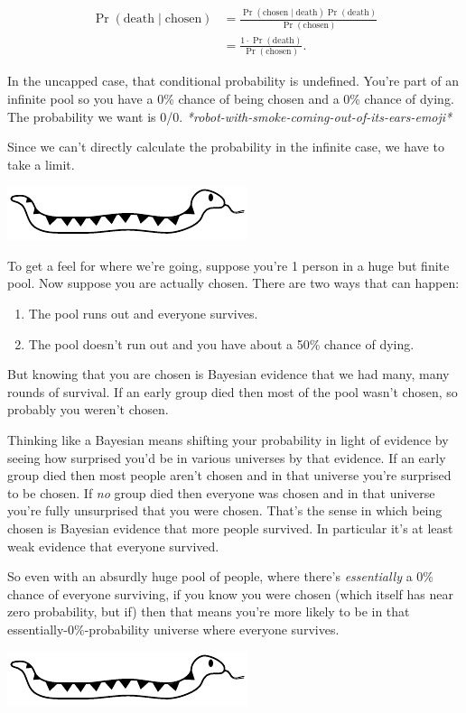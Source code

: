 \documentclass[article,twocolumn]{memoir}
\newcommand{\snakedivider}{
\vspace{.2em}
\begin{center}
\includegraphics[width=.25\linewidth]{snake}
\end{center}
\vspace{.1em}
}
\begin{document}
\begin{equation*}
\begin{split}
\Pr(\text{death} \mid \text{chosen}) & =
\frac{\Pr(\text{chosen} \mid \text{death}) \Pr(\text{death})}{\Pr(\text{chosen})} \\
& = \frac{1\cdot\Pr(\text{death})}{\Pr(\text{chosen})}.
\end{split}
\end{equation*}

In the uncapped case, that conditional probability is undefined. 
You're part of an infinite pool so you have a 0\% chance of being chosen and a 0\% chance of dying. 
The probability we want is 0/0. 
\emph{*robot-with-smoke-coming-out-of-its-ears-emoji*}

Since we can't directly calculate the probability in the infinite case, we have to take a limit.

\snakedivider

To get a feel for where we're going, suppose you're 1 person in a huge but finite pool.
Now suppose you are actually chosen. 
There are two ways that can happen: 
\begin{enumerate}
\item The pool runs out and everyone survives.
\item The pool doesn't run out and you have about a 50\% chance of dying. 
\end{enumerate}
But knowing that you are chosen is Bayesian evidence that we had many, many rounds of survival. 
If an early group died then most of the pool wasn't chosen, so probably you weren't chosen.

Thinking like a Bayesian means shifting your probability in light of evidence by seeing how surprised you'd be in various universes by that evidence.
If an early group died then most people aren't chosen and in that universe you're surprised to be chosen. 
If \emph{no} group died then everyone was chosen and in that universe you're fully unsurprised that you were chosen. 
That's the sense in which being chosen is Bayesian evidence that more people survived. 
In particular it's at least weak evidence that everyone survived.

So even with an absurdly huge pool of people, where there's \emph{essentially} a 0\% chance of everyone surviving, if you know you were chosen (which itself has near zero probability, but if) then that means you're more likely to be in that essentially-0\%-probability universe where everyone survives.

\snakedivider
\end{document}
